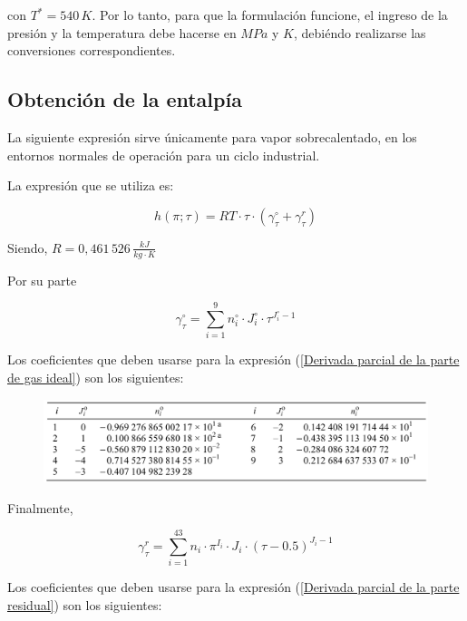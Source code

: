 \documentclass[10pt,a4paper]{article}
\begin{document}
con $T^*=540 \, K$. Por lo tanto, para que la formulación funcione, el ingreso de la presión y la temperatura debe hacerse en $M \! Pa$ y $K$, debiéndo realizarse las conversiones correspondientes.

\subsection*{Obtención de la entalpía}
La siguiente expresión sirve únicamente para vapor sobrecalentado, en los entornos normales de operación para un ciclo industrial.

La expresión que se utiliza es:

\begin{equation}
h(\pi;\tau)=RT \cdot \tau \cdot (\gamma_{\tau}^{\circ} + \gamma_{\tau}^{r})
\end{equation}

Siendo, $R=0,461\, 526 \,\frac{kJ}{kg \cdot K}$

Por su parte

\begin{equation}
\gamma_{\tau}^{\circ}=\sum_{i=1}^{9}n_i^{\circ} \cdot J_i^{\circ} \cdot \tau^{J_i^{\circ}-1} \label{Derivada parcial de la parte de gas ideal}
\end{equation}

Los coeficientes que deben usarse para la expresión (\ref{Derivada parcial de la parte de gas ideal}) son los siguientes:

\begin{figure}[hbtp]
\centering
\includegraphics[scale=0.35]{Captura01.PNG}
\end{figure}

Finalmente,

\begin{equation}
\gamma_{\tau}^{r} = \sum_{i=1}^{43} n_i \cdot \pi^{I_i} \cdot J_i \cdot (\tau-0.5)^{J_i-1} \label{Derivada parcial de la parte residual}
\end{equation}

Los coeficientes que deben usarse para la expresión (\ref{Derivada parcial de la parte residual}) son los siguientes:
\end{document}
